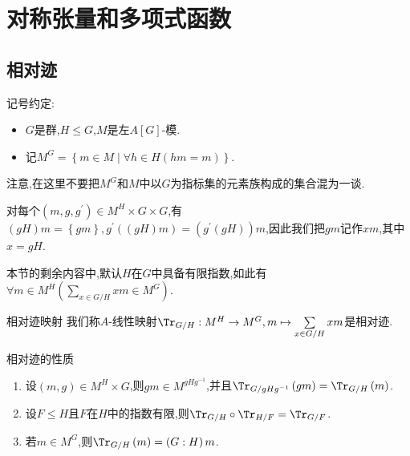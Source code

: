 \chapter{对称张量和多项式函数}

\section{相对迹}

记号约定:
\begin{itemize}
	\item $G$是群,$H\leq G$,$M$是左$A[G]$-模.
	\item 记$M^{G}=\left\{m\in M\middle|\forall h\in H\left(hm=m\right)\right\}$.
\end{itemize}
注意,在这里不要把$M^{G}$和$M$中以$G$为指标集的元素族构成的集合混为一谈.

\begin{remark}{}{}
	对每个$\left(m,g,g^{\prime}\right)\in M^{H}\times G\times G$,有$\left(gH\right)m=\left\{gm\right\},g^{\prime}\left(\left(gH\right)m\right)=\left(g^{\prime}\left(gH\right)\right)m$,因此我们把$gm$记作$xm$,其中$x=gH$.
\end{remark}

本节的剩余内容中,默认$H$在$G$中具备有限指数,如此有$\forall m\in M^{H}\left(\sum\limits_{x\in G/H}xm\in M^{G}\right)$.

\begin{definition}{相对迹映射}{}
	我们称$A$-线性映射$\Tr_{G/H}:M^{H}\to M^{G},m\mapsto\sum\limits_{x\in G/H}xm$是相对迹.
\end{definition}

\begin{proposition}{相对迹的性质}{}
	\begin{enumerate}
		\item 设$\left(m,g\right)\in M^{H}\times G$,则$gm\in M^{gHg^{-1}}$,并且$\Tr_{G/gHg^{-1}}\left(gm\right)=\Tr_{G/H}\left(m\right)$.
		\item 设$F\leq H$且$F$在$H$中的指数有限,则$\Tr_{G/H}\circ\Tr_{H/F}=\Tr_{G/F}$.
		\item 若$m\in M^{G}$,则$\Tr_{G/H}\left(m\right)=\left(G:H\right)m$.
	\end{enumerate}
\end{proposition}




















